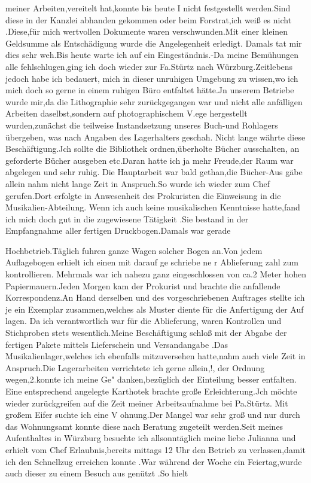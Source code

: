 \documentclass[a4paper,11pt]{article}
\begin{document}
meiner Arbeiten,vereitelt hat,konnte bis heute I nicht festgestellt werden.Sind diese in der Kanzlei abhanden gekommen oder beim Forstrat,ich weiß es nicht .Diese,für mich wertvollen Dokumente waren verschwunden.Mit einer kleinen Geldsumme als Entschädigung wurde die Angelegenheit erledigt. Damals tat mir dies sehr weh.Bis heute warte ich auf ein Eingeständnis.-Da meine Bemühungen alle fehlschlugen,ging ich doch wieder zur Fa.Stürtz nach Würzburg.Zeitlebens jedoch habe ich bedauert, mich in dieser unruhigen Umgebung zu wissen,wo ich mich doch so gerne in einem ruhigen Büro entfaltet hätte.Jn unserem Betriebe wurde mir,da die Lithographie sehr zurückgegangen war und nicht alle anfälligen Arbeiten daselbst,sondern auf photographischem V.ege hergestellt wurden,zunächst die teilweise Instandsetzung unseres Buch-und Rohlagers übergeben, was nach Angaben des Lagerhalters geschah. Nicht lange währte diese Beschäftigung.Jch sollte die Bibliothek ordnen,überholte Bücher ausschalten, an geforderte Bücher ausgeben etc.Daran hatte ich ja mehr Freude,der Raum war abgelegen und sehr ruhig. Die Hauptarbeit war bald gethan,die Bücher-Aus gäbe allein nahm nicht lange Zeit in Anspruch.So wurde ich wieder zum Chef gerufen.Dort erfolgte in Anwesenheit des Prokuristen die Einweisung in die Musikalien-Abteilung. Wenn ich auch keine musikalischen Kenntnisse hatte,fand ich mich doch gut in die zugewiesene Tätigkeit .Sie bestand in der Empfangnahme aller fertigen Druckbogen.Damals war gerade

Hochbetrieb.Täglich fuhren ganze Wagen solcher Bogen an.Von jedem Auflagebogen erhielt ich einen mit darauf ge schriebe ne r Ablieferung zahl zum kontrollieren. Mehrmals war ich nahezu ganz eingeschlossen von ca.2 Meter hohen Papiermauern.Jeden Morgen kam der Prokurist und brachte die anfallende Korrespondenz.An Hand derselben und des vorgeschriebenen Auftrages stellte ich je ein Exemplar zusammen,welches als Muster diente für die Anfertigung der Auf lagen. Da ich verantwortlich war für die Ablieferung, waren Kontrollen und Stichproben stets wesentlich.Meine Beschäftigung schloß mit der Abgabe der fertigen Pakete mittels Lieferschein und Versandangabe .Das Musikalienlager,welches ich ebenfalls mitzuversehen hatte,nahm auch viele Zeit in Anspruch.Die Lagerarbeiten verrichtete ich gerne allein,!, der Ordnung wegen,2.konnte ich meine Ge" danken,bezüglich der Einteilung besser entfalten. Eine entsprechend angelegte Karthotek brachte große Erleichterung.Jch möchte wieder zurückgreifen auf die Zeit meiner Arbeitsaufnahme bei Pa.Stürtz. Mit großem Eifer suchte ich eine V ohnung.Der Mangel war sehr groß und nur durch das Wohnungsamt konnte diese nach Beratung zugeteilt werden.Seit meines Aufenthaltes in Würzburg besuchte ich allsonntäglich meine liebe Julianna und erhielt vom Chef Erlaubnis,bereits mittags 12 Uhr den Betrieb zu verlassen,damit ich den Schnellzug erreichen konnte .War während der Woche ein Feiertag,wurde auch dieser zu einem Besuch aus genützt .So hielt
\end{document}

